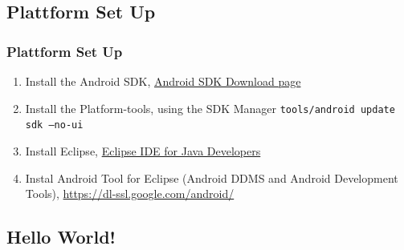 \subsection[Plattform Set Up]{Plattform Set Up}
\begin{frame}
\frametitle{Plattform Set Up}
\begin{enumerate}
 	\item Install the Android SDK, \href{http://developer.android.com/sdk/index.html}{Android SDK Download page}
	\item Install the Platform-tools, using the SDK Manager \texttt{tools/android update sdk --no-ui}
	\item Install Eclipse, \href{http://www.eclipse.org/downloads}{Eclipse IDE for Java Developers}
	\item Instal Android Tool for Eclipse (Android DDMS and Android Development Tools), \url{https://dl-ssl.google.com/android/}

\end{enumerate}
\end{frame}
\subsection{Hello World!}

